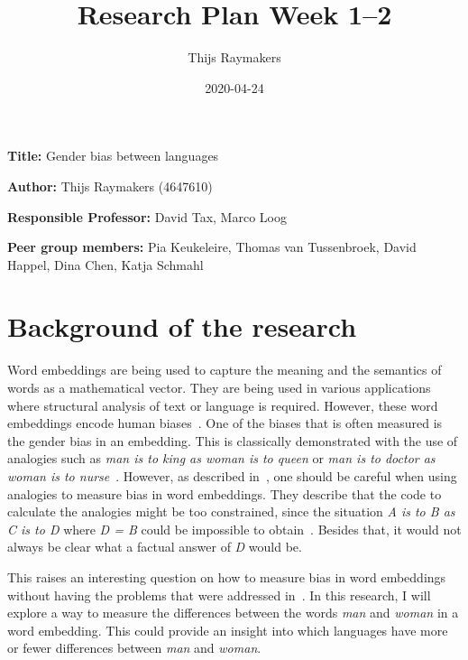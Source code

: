 \documentclass[english, a4paper, 10pt]{article}
\title{Research Plan Week 1--2}
\author{Thijs Raymakers}
\date{2020-04-24}
\newcommand{\namelistlabel}[1]{\mbox{#1}\hfil}
\newenvironment{namelist}[1]{%
\begin{list}{}
    {
        \let\makelabel\namelistlabel
        \settowidth{\labelwidth}{#1}
        \setlength{\leftmargin}{1.1\labelwidth}
    }
  }{%
\end{list}}
\begin{document}
\maketitle

\begin{namelist}{xxxxxxxxxxxxxxxxxxxxxxxxxxxxxxxxxxxxxxx}
\item[{\bf Title:}]
    Gender bias between languages
\item[{\bf Author:}]
    Thijs Raymakers (4647610)
\item[{\bf Responsible Professor:}]
    David Tax, Marco Loog
\item[{\bf Peer group members:}]
    Pia Keukeleire, 
    Thomas van Tussenbroek,
    David Happel,
    Dina Chen,
    Katja Schmahl
\end{namelist}


\section*{Background of the research}
Word embeddings are being used to capture the meaning and the semantics of words as a
mathematical vector. They are being used in various applications where structural
analysis of text or language is required. However, these word embeddings encode
human biases~\cite{caliskan_2017_semantics_language_corpora, nissim_fair_is_better_2020, 2017arXiv171108412G, 2018arXiv180309288K, 2019arXiv190303862G}. One of the biases that is often
measured is the gender bias in an embedding. This is classically demonstrated with the
use of analogies such as \textit{man is to king as woman is to queen} or \textit{man is to doctor as woman is to nurse}~\cite{nissim_fair_is_better_2020}.
However, as described in~\cite{nissim_fair_is_better_2020}, one should be careful when using
analogies to measure bias in word embeddings. They describe that the code to calculate
the analogies might be too constrained, since the situation \textit{A is to B as C is to D}
where \textit{D = B} could be impossible to obtain~\cite{nissim_fair_is_better_2020}. Besides
that, it would not always be clear what a factual answer of \textit{D} would be.

This raises an interesting question on how to measure bias in word embeddings without
having the problems that were addressed in~\cite{nissim_fair_is_better_2020}.
In this research, I will explore a way to measure the differences between the
words \textit{man} and \textit{woman} in a word embedding. This could provide an
insight into which languages have more or fewer differences between \textit{man} and 
\textit{woman}.
\end{document}
